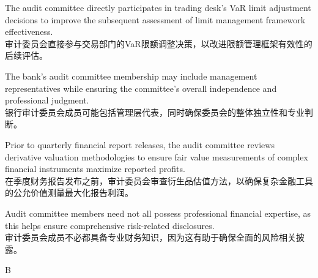 \documentclass{article}
\begin{document}
\begin{choices}
    \item The audit committee directly participates in trading desk's VaR limit adjustment decisions to improve the subsequent assessment of limit management framework effectiveness.\\
    审计委员会直接参与交易部门的VaR限额调整决策，以改进限额管理框架有效性的后续评估。
    
    \item The bank's audit committee membership may include management representatives while ensuring the committee's overall independence and professional judgment.\\
    银行审计委员会成员可能包括管理层代表，同时确保委员会的整体独立性和专业判断。
    
    \item Prior to quarterly financial report releases, the audit committee reviews derivative valuation methodologies to ensure fair value measurements of complex financial instruments maximize reported profits.\\
    在季度财务报告发布之前，审计委员会审查衍生品估值方法，以确保复杂金融工具的公允价值测量最大化报告利润。
    
    \item Audit committee members need not all possess professional financial expertise, as this helps ensure comprehensive risk-related disclosures.\\
    审计委员会成员不必都具备专业财务知识，因为这有助于确保全面的风险相关披露。
\end{choices}

\begin{correctanswer}
    B
\end{correctanswer}
\end{document}
